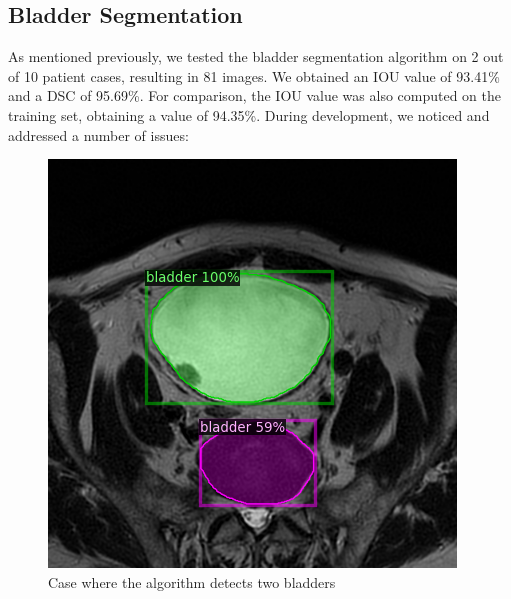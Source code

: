 \documentclass[runningheads,a4paper,11pt]{report}
\begin{document}
\subsection{Bladder Segmentation}

As mentioned previously, we tested the bladder segmentation algorithm on 2 out of 10 patient cases, resulting in 81 images. We obtained an IOU value of 93.41\% and a DSC of 95.69\%. For comparison, the IOU value was also computed on the training set, obtaining a value of 94.35\%. During development, we noticed and addressed a number of issues:

\begin{figure}[!tbp]
  \centering
  \begin{minipage}[b]{0.4\textwidth}
    \includegraphics[width=\textwidth]{images/bladder_2.png}
    \caption{Case where the algorithm detects two bladders} \label{bladder_2}
  \end{minipage}
  \hfill
  \begin{minipage}[b]{0.4\textwidth}

\end{minipage}
\end{figure}
\end{document}
